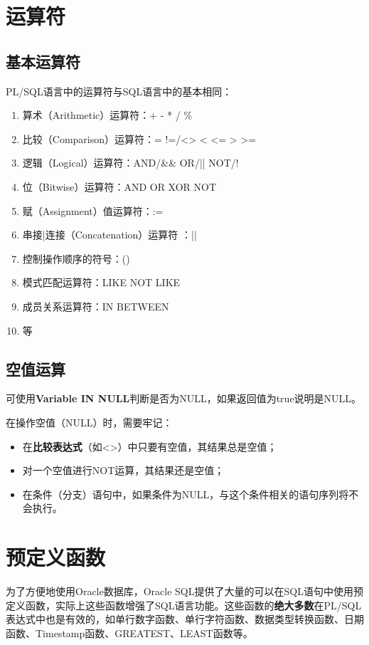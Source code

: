 \documentclass[11pt, a4paper, oneside, UTF8]{ctexbook}
\let\kaishu\relax %
\begin{document}
\chapter{运算符}

\section{基本运算符}
PL/SQL语言中的运算符与SQL语言中的基本相同：
\begin{enumerate}
  \item 算术（Arithmetic）运算符：+ - * / \%
  \item 比较（Comparison）运算符：= !=/<> < <= > >=
  \item 逻辑（Logical）运算符：AND/\&\& OR/|| NOT/!
  \item 位（Bitwise）运算符：AND OR XOR NOT
  \item 赋（Assignment）值运算符：:=
  \item 串接|连接（Concatenation）运算符 ：||
  \item 控制操作顺序的符号：()
  \item 模式匹配运算符：LIKE NOT LIKE
  \item 成员关系运算符：IN BETWEEN
  \item 等
\end{enumerate}
\section{空值运算}
可使用{\bfseries\kaishu Variable IN NULL}判断是否为NULL，如果返回值为true说明是NULL。

在操作空值（NULL）时，需要牢记：
\begin{itemize}
  \item 在{\bfseries\kaishu 比较表达式}（如<>）中只要有空值，其结果总是空值；
  \item 对一个空值进行NOT运算，其结果还是空值；
  \item 在条件（分支）语句中，如果条件为NULL，与这个条件相关的语句序列将不会执行。
\end{itemize}



\chapter{预定义函数}
为了方便地使用Oracle数据库，Oracle SQL提供了大量的可以在SQL语句中使用预定义函数，实际上这些函数增强了SQL语言功能。这些函数的{\bfseries\kaishu 绝大多数}在PL/SQL表达式中也是有效的，如单行数字函数、单行字符函数、数据类型转换函数、日期函数、Timestamp函数、GREATEST、LEAST函数等。
\end{document}
